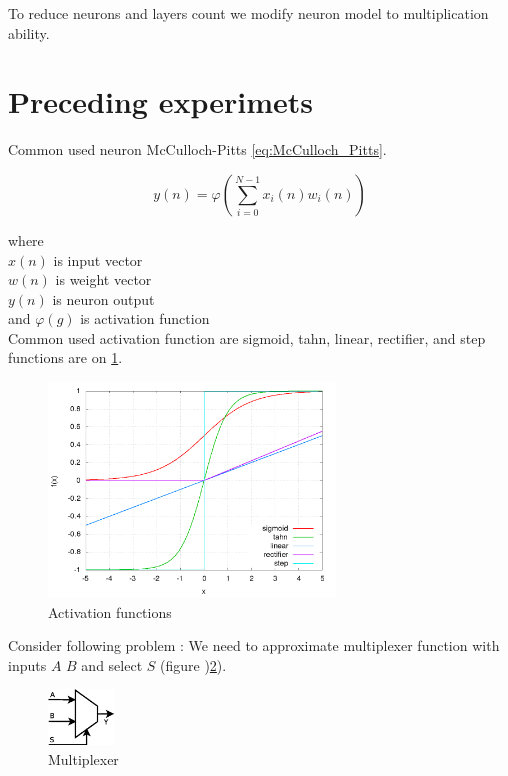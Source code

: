 \documentclass[10pt,a5paper]{article}
\begin{document}
To reduce neurons and layers count we modify neuron model to multiplication ability.


\section{Preceding experimets}

Common used neuron McCulloch-Pitts \ref{eq:McCulloch_Pitts}.

\begin{equation}
\label{eq:McCulloch_Pitts}
  y(n) = \varphi(\sum_{i = 0}^{N-1} x_i(n)w_i(n))
\end{equation}

where \\
$x(n)$ is input vector \\
$w(n)$ is weight vector \\
$y(n)$ is neuron output \\
and $\varphi(g)$ is activation function \\

Common used activation function are sigmoid, tahn, linear, rectifier, and step functions
are on \ref{img:activation_functions}.


\begin{figure}[!ht]
\centering
\includegraphics[width=3.0in]{images/nn_functions.png}
\caption{Activation functions}
\label{img:activation_functions}
\end{figure}

Consider following problem : We need to approximate multiplexer function with inputs
$A$ $B$ and select $S$ (figure )\ref{img:multiplexer}).

\begin{figure}[!ht]
\centering
\includegraphics[width=0.7in]{images/mux.eps}
\caption{Multiplexer}
\label{img:multiplexer}
\end{figure}
\end{document}
